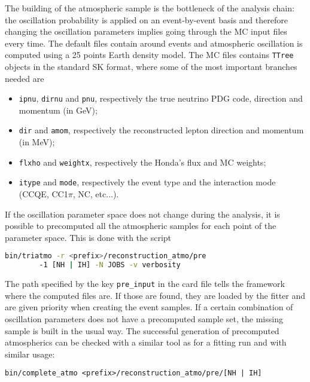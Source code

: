 \documentclass[a4paper, 11pt]{article}
\begin{document}
The building of the atmospheric sample is the bottleneck of the analysis chain: %
the oscillation probability is applied on an event-by-event basis and therefore changing %
the oscillation parameters implies going through the MC input files every time.
The default files contain around  events and atmospheric oscillation is computed using %
a 25 points Earth density model.
The MC files contains \texttt{TTree} objects in the standard SK format, where some of the most important branches needed are
\begin{itemize}
	\item \texttt{ipnu}, \texttt{dirnu} and \texttt{pnu}, respectively the true neutrino PDG code, direction and momentum (in GeV);
	\item \texttt{dir} and \texttt{amom}, respectively the reconstructed lepton direction and momentum (in MeV);
	\item \texttt{flxho} and \texttt{weightx}, respectively the Honda's flux and MC weights;
	\item \texttt{itype} and \texttt{mode}, respectively the event type and the interaction mode (CCQE, CC1$\pi$, NC, etc...).
\end{itemize}

If the oscillation parameter space does not change during the analysis, it is possible to precomputed %
all the atmospheric samples for each point of the parameter space.
This is done with the script
\begin{lstlisting}[language=bash]
    bin/triatmo -r <prefix>/reconstruction_atmo/pre
		-1 [NH | IH] -N JOBS -v verbosity
\end{lstlisting}
The path specified by the key \texttt{pre\_input} in the card file tells the framework where %
the computed files are.
If those are found, they are loaded by the fitter and are given priority when %
creating the event samples.
If a certain combination of oscillation parameters does not have a precomputed sample set, %
the missing sample is built in the usual way.
The successful generation of precomputed atmospherics can be checked with a similar tool as for %
a fitting run and with similar usage:
\begin{lstlisting}[]
    bin/complete_atmo <prefix>/reconstruction_atmo/pre/[NH | IH]
\end{lstlisting}
\end{document}
